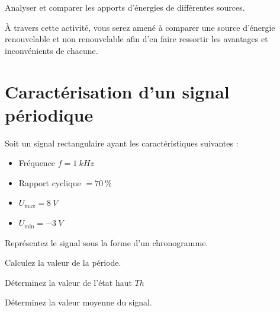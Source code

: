 \documentclass[10pt,fleqn]{article} %
\begin{document}
%

\begin{obj}
Analyser et comparer les apports d’énergies de différentes sources. 

À travers cette activité, vous serez amené à comparer une source
d’énergie renouvelable et non renouvelable afin d’en faire ressortir les
avantages et inconvénients de chacune.
\end{obj}
\section{Caractérisation d'un signal périodique}
\begin{exercise}
    Soit un signal rectangulaire ayant les caractéristiques suivantes : 
        
    \begin{itemize}
        \item Fréquence $f = \SI{1}{kHz}$
        \item Rapport cyclique $ = \SI{70}{\%}$
        \item $U_{\text{max}} = \SI{8}{V}$
        \item $U_{\text{min}} = \SI{-3}{V}$
    \end{itemize}
    
    \begin{question}
        Représentez le signal sous la forme d'un chronogramme.
    \end{question}
    \begin{question}
        Calculez la valeur de la période.
    \end{question}
    \begin{question}
        Déterminez la valeur de l'état haut $Th$
    \end{question}
    \begin{question}
        Déterminez la valeur moyenne du signal.
    \end{question}
\end{exercise}
\end{document}
